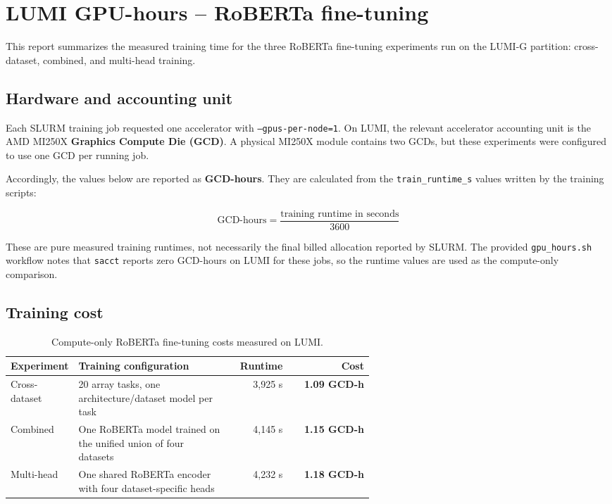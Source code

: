 \section*{LUMI GPU-hours -- RoBERTa fine-tuning}

This report summarizes the measured training time for the three RoBERTa fine-tuning experiments run on the LUMI-G partition: cross-dataset, combined, and multi-head training.

\subsection*{Hardware and accounting unit}

Each SLURM training job requested one accelerator with \texttt{--gpus-per-node=1}. On LUMI, the relevant accelerator accounting unit is the AMD MI250X \textbf{Graphics Compute Die (GCD)}. A physical MI250X module contains two GCDs, but these experiments were configured to use one GCD per running job.

Accordingly, the values below are reported as \textbf{GCD-hours}. They are calculated from the \texttt{train\_runtime\_s} values written by the training scripts:

\[
\text{GCD-hours} = \frac{\text{training runtime in seconds}}{3600}
\]

These are pure measured training runtimes, not necessarily the final billed allocation reported by SLURM. The provided \texttt{gpu\_hours.sh} workflow notes that \texttt{sacct} reports zero GCD-hours on LUMI for these jobs, so the runtime values are used as the compute-only comparison.

\subsection*{Training cost}

\begin{table}[h!]
\centering
\begin{tabular}{p{0.18\linewidth}p{0.42\linewidth}rr}
\toprule
\textbf{Experiment} & \textbf{Training configuration} & \textbf{Runtime} & \textbf{Cost} \\
\midrule
Cross-dataset & 20 array tasks, one architecture/dataset model per task & 3,925 s & \textbf{1.09 GCD-h} \\
Combined & One RoBERTa model trained on the unified union of four datasets & 4,145 s & \textbf{1.15 GCD-h} \\
Multi-head & One shared RoBERTa encoder with four dataset-specific heads & 4,232 s & \textbf{1.18 GCD-h} \\
\bottomrule
\end{tabular}
\caption{Compute-only RoBERTa fine-tuning costs measured on LUMI.}
\label{tab:lumi_gpu_hours}
\end{table}

